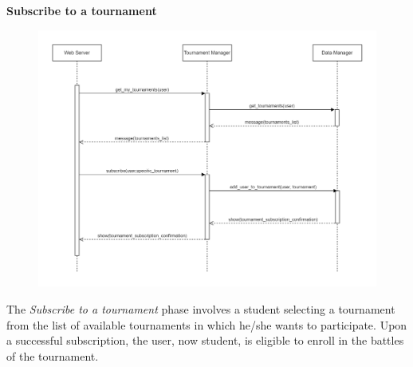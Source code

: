 \documentclass[../DD.tex]{subfiles}
\begin{document}
    \textbf{Subscribe to a tournament}\\
    \begin{figure}[H]
        \centering
        \hspace*{-3cm}
        \includegraphics[width=1.35\textwidth]{../assets/section_2/SubscribeToATournament.png}
    \end{figure}
    The \textit{Subscribe to a tournament} phase involves a student selecting a tournament from the list of available tournaments in which he/she wants to participate.
    Upon a successful subscription, the user, now student, is eligible to enroll in the battles of the tournament. 
    \newpage
\end{document}
